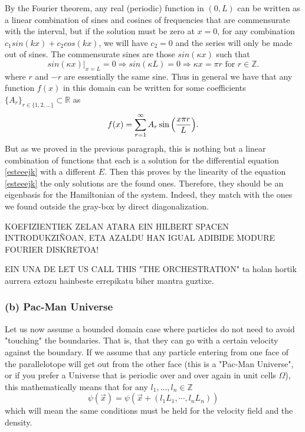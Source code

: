 \documentclass[11pt, a4paper]{article} %
\newcommand{\R}{\mathbb{R}} %
\newcommand{\Z}{\mathbb{Z}} %
\begin{document}
{By the Fourier theorem, any real (periodic) function in $(0,L)$ can be written as a linear combination of sines and cosines of frequencies that are commensurate with the interval, but if the solution must be zero at $x=0$, for any combination $c_1sin(kx)+c_2cos(kx)$, we will have $c_2=0$ and the series will only be made out of sines. The commensurate sines are those $sin(\kappa x)$ such that
\begin{equation}
sin(\kappa x)\Big\rvert_{x=L}=0\Rightarrow sin(\kappa L)=0\Rightarrow \kappa x=\pi r \text{ for } r\in\Z.
\end{equation}
where $r$ and $-r$ are essentially the same sine.
Thus in general we have that any function $f(x)$ in this domain can be written for some coefficients $\{A_r\}_{r\in\{1,2,...\}}\subset \R$ as
\begin{equation}
f(x)=\sum_{r=1}^\infty A_r \sin{\qty(\frac{x\pi r}{L})}.
\end{equation} 
But as we proved in the previous paragraph, this is nothing but a linear combination of functions that each is a solution for the differential equation \eqref{esteeejk} with a different $E$. Then this proves by the linearity of the equation \eqref{esteeejk} the only solutions are the found ones. Therefore, they should be an eigenbasis for the Hamiltonian of the system. Indeed, they match with the ones we found outside the gray-box by direct diagonalization.

}

KOEFIZIENTIEK ZELAN ATARA EIN HILBERT SPACEN INTRODUKZIÑOAN, ETA AZALDU HAN IGUAL ADIBIDE MODURE FOURIER DISKRETOA!

EIN UNA DE LET US CALL THIS "THE ORCHESTRATION" ta holan hortik aurrera eztozu hainbeste errepikatu biher mantra guztixe.


 

\subsubsection*{(b) Pac-Man Universe}
Let us now assume a bounded domain case where particles do not need to avoid "touching" the boundaries. That is, that they can go with a certain velocity against the boundary. If we assume that any particle entering from one face of the parallelotope will get out from the other face (this is a "Pac-Man Universe", or if you prefer a Universe that is periodic over and over again in unit cells $\Omega$), this mathematically means that for any $l_1,...,l_n\in\Z$
\begin{equation}
\psi(\vec{x})=\psi(\vec{x}+(l_1L_1,\cdots , l_nL_n))
\end{equation}
which will mean the same conditions must be held for the velocity field and the density.
\end{document}
